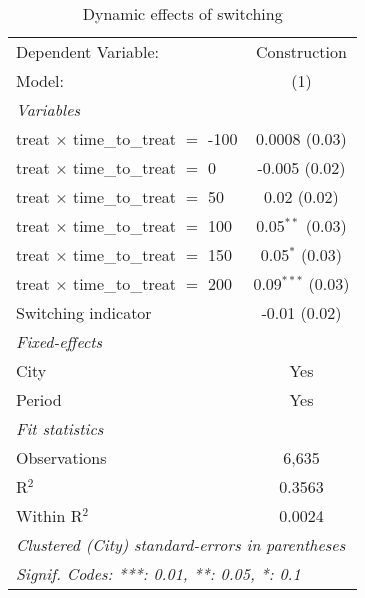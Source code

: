 \begin{table}[htbp]
   \caption{Dynamic effects of switching}
   \centering
   \begin{tabular}{lc}
      \tabularnewline \midrule \midrule
      Dependent Variable:                        & Construction\\  
      Model:                                     & (1)\\  
      \midrule
      \emph{Variables}\\
      treat $\times$ time\_to\_treat $=$ -100    & 0.0008 (0.03)\\   
      treat $\times$ time\_to\_treat $=$ 0       & -0.005 (0.02)\\   
      treat $\times$ time\_to\_treat $=$ 50      & 0.02 (0.02)\\   
      treat $\times$ time\_to\_treat $=$ 100     & 0.05$^{**}$ (0.03)\\   
      treat $\times$ time\_to\_treat $=$ 150     & 0.05$^{*}$ (0.03)\\   
      treat $\times$ time\_to\_treat $=$ 200     & 0.09$^{***}$ (0.03)\\   
      Switching indicator                        & -0.01 (0.02)\\   
      \midrule
      \emph{Fixed-effects}\\
      City                                       & Yes\\  
      Period                                     & Yes\\  
      \midrule
      \emph{Fit statistics}\\
      Observations                               & 6,635\\  
      R$^2$                                      & 0.3563\\  
      Within R$^2$                               & 0.0024\\  
      \midrule \midrule
      \multicolumn{2}{l}{\emph{Clustered (City) standard-errors in parentheses}}\\
      \multicolumn{2}{l}{\emph{Signif. Codes: ***: 0.01, **: 0.05, *: 0.1}}\\
   \end{tabular}
\end{table}
